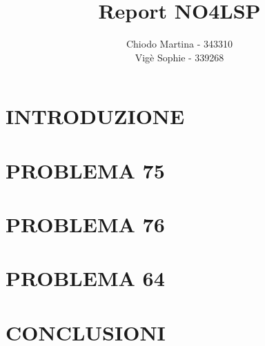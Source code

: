 \documentclass{article}
\title{Report NO4LSP}
\author{Chiodo Martina - 343310 \\ Vigè Sophie - 339268}
\date{}
\begin{document}
%

\maketitle

\section*{INTRODUZIONE}


\newpage
\section*{PROBLEMA 75}


\newpage
\section*{PROBLEMA 76}


\newpage
\section*{PROBLEMA 64}


\newpage
\section*{CONCLUSIONI}

\end{document}
